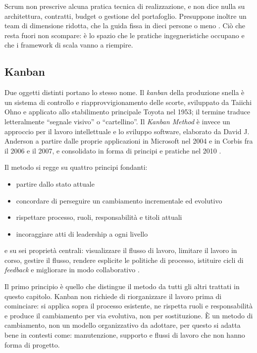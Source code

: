 Scrum non prescrive alcuna pratica tecnica di
realizzazione, e non dice nulla su architettura, contratti, budget o gestione
del portafoglio. Presuppone inoltre un team di dimensione ridotta, che la guida
fissa in dieci persone o meno \cite{scrumguide2020}. Ci\`o che resta fuori non
scompare: \`e lo spazio che le pratiche ingegneristiche occupano e che i
framework di scala vanno a riempire.

\subsection{Kanban}

Due oggetti distinti portano lo stesso nome. Il \emph{kanban} della produzione
snella \`e un sistema di controllo e riapprovvigionamento delle scorte,
sviluppato da Taiichi Ohno e applicato allo stabilimento principale Toyota nel
1953; il termine traduce letteralmente ``segnale visivo'' o ``cartellino''. Il
\emph{Kanban Method} \`e invece un approccio per il lavoro intellettuale e lo
sviluppo software, elaborato da David J. Anderson a partire dalle proprie
applicazioni in Microsoft nel 2004 e in Corbis fra il 2006 e il 2007, e
consolidato in forma di principi e pratiche nel 2010
\cite{agilepracticeguide2}.

Il metodo si regge su quattro principi fondanti:
\begin {itemize}
\item partire dallo stato attuale
\item concordare di perseguire un cambiamento incrementale ed evolutivo
\item rispettare processo, ruoli, responsabilit\`a e titoli attuali
\item incoraggiare atti di leadership a ogni livello
\end {itemize}

e su sei propriet\`a centrali: visualizzare il flusso di lavoro, limitare il
lavoro in corso, gestire il flusso, rendere esplicite le politiche di processo,
istituire cicli di \emph{feedback} e migliorare in modo collaborativo
\cite{agilepracticeguide2}.

Il primo principio \`e quello che distingue il metodo da tutti gli altri
trattati in questo capitolo. Kanban non richiede di riorganizzare il lavoro
prima di cominciare: si applica sopra il processo esistente, ne rispetta ruoli
e responsabilit\`a e produce il cambiamento per via evolutiva, non per
sostituzione. \`E un metodo di cambiamento, non un modello organizzativo da
adottare, per questo si adatta bene in contesti come:
manutenzione, supporto e flussi di lavoro che non hanno forma di progetto.

